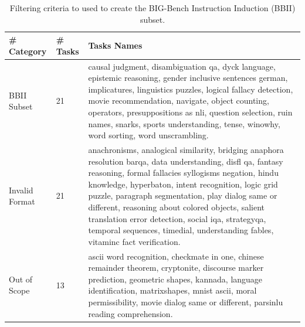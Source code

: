 \begin{table}[H]
\caption{Filtering criteria to used to create the BIG-Bench Instruction Induction (BBII) subset.}
\label{table:bbii_categorize}
\small
\centering
\begin{tabular}{m{2cm}m{1cm}m{10cm}}
\toprule
\textbf{\# Category} & \textbf{\# Tasks} & \textbf{Tasks Names} \\
\midrule
BBII Subset & 21 & causal judgment, disambiguation qa, dyck language, epistemic reasoning, gender inclusive sentences german, implicatures, linguistics puzzles, logical fallacy detection, movie recommendation, navigate, object counting, operators, presuppositions as nli, question selection, ruin names, snarks, sports understanding, tense, winowhy, word sorting, word unscrambling.\\
\midrule
Invalid Format & 21 & anachronisms, analogical similarity, bridging anaphora resolution barqa, data understanding, disfl qa, fantasy reasoning, formal fallacies syllogisms negation, hindu knowledge, hyperbaton, intent recognition, logic grid puzzle, paragraph segmentation, play dialog same or different, reasoning about colored objects, salient translation error detection, social iqa, strategyqa, temporal sequences, timedial, understanding fables, vitaminc fact verification.\\
\midrule
Out of Scope & 13 &ascii word recognition, checkmate in one, chinese remainder theorem, cryptonite, discourse marker prediction, geometric shapes, kannada, language identification, matrixshapes, mnist ascii, moral permissibility, movie dialog same or different, parsinlu reading comprehension.\\
\bottomrule
\end{tabular}
\end{table}



